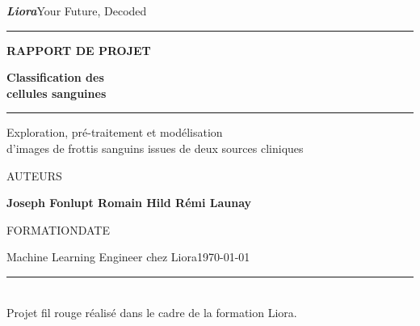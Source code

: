 \documentclass[11pt,a4paper]{article}
\newcommand{\liorarule}[1][3pt]{{\color{liorared}\rule{2.4cm}{#1}}}
\begin{document}
\begin{titlepage}
\sffamily
\setlength{\parindent}{0pt}

{\large\bfseries\itshape\color{lioraink}Liora}\hfill{\footnotesize\color{lioragrey}Your Future, Decoded}\\[2pt]
{\color{lioraline}\rule{\linewidth}{0.8pt}}

\vspace*{3.8cm}

{\footnotesize\bfseries\color{liorared}\MakeUppercase{Rapport de projet}\par}
\vspace{0.7em}
{\color{lioraink}\fontsize{34}{40}\selectfont\bfseries Classification des\\cellules sanguines\par}
\vspace{1.1em}
{\liorarule[3pt]\par}
\vspace{1.1em}
{\large\color{lioragrey}Exploration, pré-traitement et modélisation\\d'images de frottis sanguins issues de deux sources cliniques\par}

\vfill

{\footnotesize\color{lioragrey}\MakeUppercase{Auteurs}\par}
\vspace{0.35em}
{\large\bfseries\color{lioraink}Joseph Fonlupt \quad\textperiodcentered\quad Romain Hild \quad\textperiodcentered\quad Rémi Launay\par}

\vspace{1.8em}
{\footnotesize\color{lioragrey}\MakeUppercase{Formation}\hfill\MakeUppercase{Date}\par}
\vspace{0.35em}
 {\color{lioraink}Machine Learning Engineer chez Liora\hfill\today\par}

\vspace{2.2em}
{\color{lioraline}\rule{\linewidth}{0.8pt}}\\[3pt]
{\footnotesize\color{lioragrey}Projet fil rouge réalisé dans le cadre de la formation Liora.}
\end{titlepage}

\thispagestyle{plain}
\tableofcontents
\listoftodos
\clearpage









\printbibliography[heading=bibintoc,title={Bibliographie}]
\end{document}
